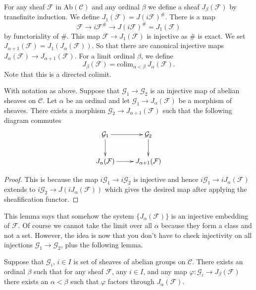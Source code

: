 \medskip\noindent
For any sheaf $\mathcal{F}$ in $\text{Ab}(\mathcal{C})$ and
any ordinal $\beta$ we define a sheaf
$J_\beta(\mathcal{F})$ by transfinite induction.
We define $J_1(\mathcal{F})=J(i\mathcal{F})^\#$.
There is a map
$$
\mathcal{F} \longrightarrow
i\mathcal{F}^\# \longrightarrow
J(i\mathcal{F})^\# = J_1(\mathcal{F})
$$
by functoriality of $\#$. This map $\mathcal{F} \to J_1(\mathcal{F})$
is injective as $\#$ is exact. We set
$J_{\alpha + 1}(\mathcal{F}) = J_1(J_\alpha(\mathcal{F}))$.
So that there are canonical injective maps
$J_\alpha(\mathcal{F}) \to J_{\alpha + 1}(\mathcal{F})$.
For a limit ordinal $\beta$, we define
$$
J_\beta(\mathcal{F}) = \text{colim}_{\alpha < \beta}\ J_\alpha(\mathcal{F}).
$$
Note that this is a directed colimit.

\begin{lemma}
\label{lemma-map-into-next-one}
With notation as above.
Suppose that $\mathcal{G}_1 \to \mathcal{G}_2$ is an injective
map of abelian sheaves on $\mathcal{C}$. Let $\alpha$ be an ordinal
and let $\mathcal{G}_1 \to J_\alpha(\mathcal{F})$ be a morphism
of sheaves. There exists a morphism $\mathcal{G}_2 \to
J_{\alpha+1}(\mathcal{F})$ such that the following diagram commutes
$$
\xymatrix{
\mathcal{G}_1 \ar[d] \ar[r] & \mathcal{G}_2 \ar[d] \\
J_{\alpha}(\mathcal{F}) \ar[r] & J_{\alpha+1}(\mathcal{F}) }
$$
\end{lemma}

\begin{proof}
This is because the map $i\mathcal{G}_1 \to i\mathcal{G}_2$ is injective
and hence $i\mathcal{G}_1 \to iJ_\alpha(\mathcal{F})$ extends to
$i\mathcal{G}_2 \to J(iJ_\alpha(\mathcal{F}))$ which gives the
desired map after applying the sheafification functor.
\end{proof}

\noindent
This lemma says that somehow the system $\{J_{\alpha}(\mathcal{F})\}$
is an injective embedding of $\mathcal{F}$. Of course
we cannot take the limit over all $\alpha$ because they form a class
and not a set. However, the idea is now that you don't have to check
injectivity on all injections $\mathcal{G}_1 \to \mathcal{G}_2$, plus
the following lemma.

\begin{lemma}
\label{lemma-map-into-smaller}
Suppose that $\mathcal{G}_i$, $i\in I$ is set of sheaves of abelian 
groups on $\mathcal{C}$. There exists an ordinal $\beta$ such that
for any sheaf $\mathcal{F}$, any $i\in I$, and any map $\varphi : 
\mathcal{G}_i \to J_\beta(\mathcal{F})$ there exists an 
$\alpha < \beta$ such that $ \varphi $ factors through 
$J_\alpha(\mathcal{F})$.
\end{lemma}

